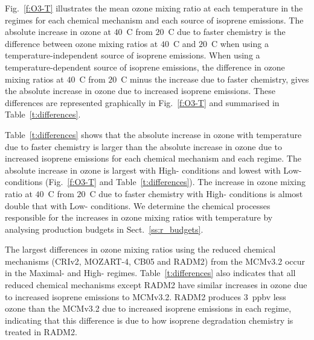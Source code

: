 Fig.~\ref{f:O3-T} illustrates the mean ozone mixing ratio at each temperature in the  regimes for each chemical mechanism and each source of isoprene emissions.  
The absolute increase in ozone at $40$~\degree C from $20$~\degree C due to faster chemistry is the difference between ozone mixing ratios at $40$~\degree C and $20$~\degree C when using a temperature-independent source of isoprene emissions.
When using a temperature-dependent source of isoprene emissions, the difference in ozone mixing ratios at $40$~\degree C from $20$~\degree C minus the increase due to faster chemistry, gives the absolute increase in ozone due to increased isoprene emissions.
These differences are represented graphically in Fig.~\ref{f:O3-T} and summarised in Table~\ref{t:differences}.

Table~\ref{t:differences} shows that the absolute increase in ozone with temperature due to faster chemistry is larger than the absolute increase in ozone due to increased isoprene emissions for each chemical mechanism and each  regime.
The absolute increase in ozone is largest with High- conditions and lowest with Low- conditions (Fig.~\ref{f:O3-T} and Table~\ref{t:differences}).
The increase in ozone mixing ratio at $40$~\degree C from $20$~\degree C due to faster chemistry with High- conditions is almost double that with Low- conditions.
We determine the chemical processes responsible for the increases in ozone mixing ratios with temperature by analysing  production budgets in Sect.~\ref{ss:r_budgets}.

The largest differences in ozone mixing ratios using the reduced chemical mechanisms (CRIv2, MOZART-4, CB05 and RADM2) from the MCMv3.2 occur in the Maximal- and High- regimes.
Table~\ref{t:differences} also indicates that all reduced chemical mechanisms except RADM2 have similar increases in ozone due to increased isoprene emissions to MCMv3.2.
RADM2 produces $3$~ppbv less ozone than the MCMv3.2 due to increased isoprene emissions in each  regime, indicating that this difference is due to how isoprene degradation chemistry is treated in RADM2.

